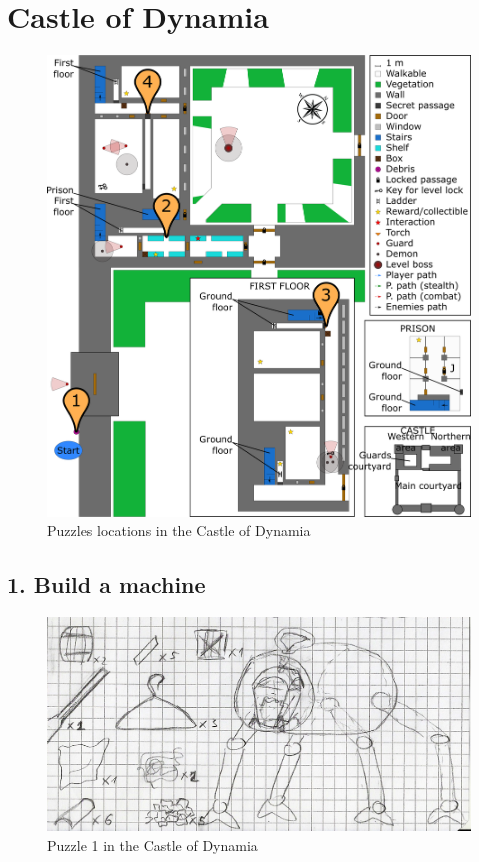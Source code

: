 {\let\clearpage\relax\section{Castle of Dynamia}}

\begin{figure}[H]
  \centering
  \includegraphics[width=\textwidth]{Images/Maps/castleOfDynamiaPuzzles}
  \caption{Puzzles locations in the Castle of Dynamia}
\end{figure}

\subsection{1. Build a machine}

\begin{figure}[H]
  \centering
  \includegraphics[width=\textwidth]{Images/Puzzles/castleOfDynamia_1}
  \caption{Puzzle 1 in the Castle of Dynamia}
\end{figure}

